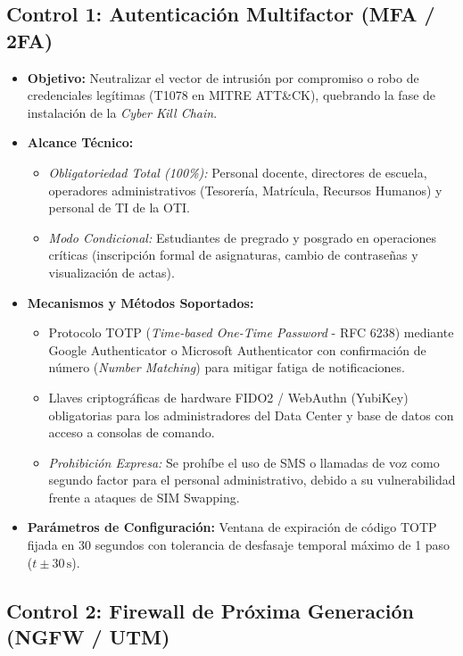 \vspace{0.2cm}

\subsection{Control 1: Autenticación Multifactor (MFA / 2FA)}

\begin{itemize}
    \item \textbf{Objetivo:} Neutralizar el vector de intrusión por compromiso o robo de credenciales legítimas (T1078 en MITRE ATT\&CK), quebrando la fase de instalación de la \textit{Cyber Kill Chain}.
    \item \textbf{Alcance Técnico:}
    \begin{itemize}
        \item \textit{Obligatoriedad Total (100\%):} Personal docente, directores de escuela, operadores administrativos (Tesorería, Matrícula, Recursos Humanos) y personal de TI de la OTI.
        \item \textit{Modo Condicional:} Estudiantes de pregrado y posgrado en operaciones críticas (inscripción formal de asignaturas, cambio de contraseñas y visualización de actas).
    \end{itemize}
    \item \textbf{Mecanismos y Métodos Soportados:}
    \begin{itemize}
        \item Protocolo TOTP (\textit{Time-based One-Time Password} - RFC 6238) mediante Google Authenticator o Microsoft Authenticator con confirmación de número (\textit{Number Matching}) para mitigar fatiga de notificaciones.
        \item Llaves criptográficas de hardware FIDO2 / WebAuthn (YubiKey) obligatorias para los administradores del Data Center y base de datos con acceso a consolas de comando.
        \item \textit{Prohibición Expresa:} Se prohíbe el uso de SMS o llamadas de voz como segundo factor para el personal administrativo, debido a su vulnerabilidad frente a ataques de SIM Swapping.
    \end{itemize}
    \item \textbf{Parámetros de Configuración:} Ventana de expiración de código TOTP fijada en 30 segundos con tolerancia de desfasaje temporal máximo de 1 paso ($t \pm 30\,\text{s}$).
\end{itemize}

\subsection{Control 2: Firewall de Próxima Generación (NGFW / UTM)}

